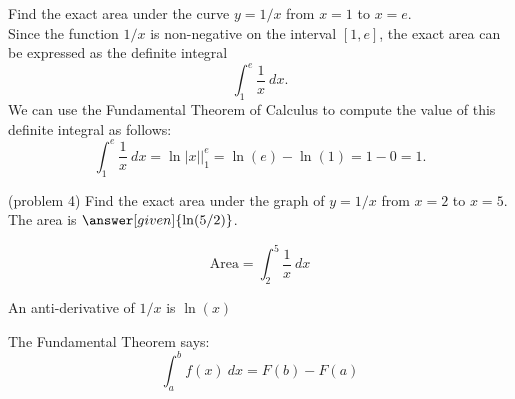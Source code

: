 \documentclass{ximera}
\begin{document}
\begin{example}[example 4]
Find the exact area under the curve $y = 1/x$ from $x=1$ to $x= e$.\\
Since the function $1/x$ is non-negative on the interval $[1, e]$, the exact area can be expressed as the definite integral
\[\int_1^{e} \frac{1}{x} \ dx.\]
We can use the Fundamental Theorem of Calculus to compute the value of this definite integral as follows:
\[
\int_1^e \frac{1}{x} \ dx = \ln|x| \Big|_1^e = \ln(e) - \ln(1)= 1- 0 = 1.
\]


\begin{image}
\end{image}

\end{example}



\begin{problem}(problem 4)
Find the exact area under the graph of $y = 1/x$ from $x = 2$ to $x = 5$.\\
The area is $\answer[given]{\ln(5/2)}$.
 \begin{hint}
  \[
  \text{Area} = \int_2^{5} \frac{1}{x} \ dx
  \]
  \end{hint}
    \begin{hint}
      An anti-derivative of $1/x$ is $\ln(x)$
    \end{hint}
    \begin{hint}
      The Fundamental Theorem says:
      \[
      \int_a^b f(x) \ dx = F(b) - F(a)
      \]
    \end{hint}    
		
		
\end{problem}
\end{document}
